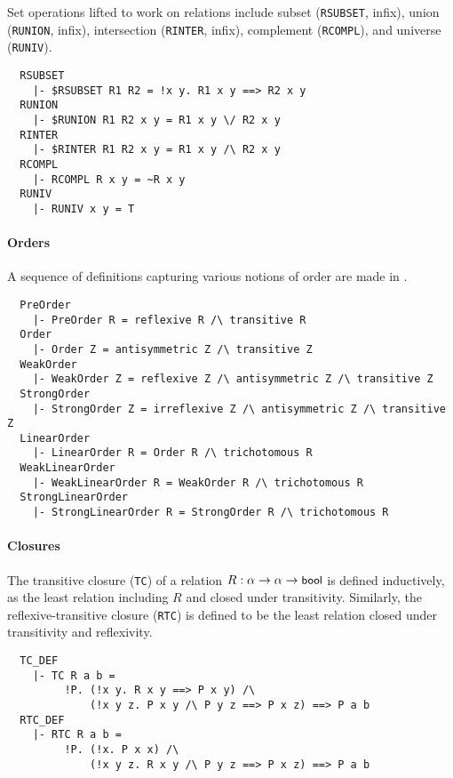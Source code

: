 Set  operations lifted to work on relations include subset
({\small\verb+RSUBSET+}, infix),
union ({\small\verb+RUNION+}, infix),
intersection ({\small\verb+RINTER+}, infix),
complement ({\small\verb+RCOMPL+}), and universe ({\small\verb+RUNIV+}).
%
\begin{hol}
{\small
\begin{verbatim}
  RSUBSET
    |- $RSUBSET R1 R2 = !x y. R1 x y ==> R2 x y
  RUNION
    |- $RUNION R1 R2 x y = R1 x y \/ R2 x y
  RINTER
    |- $RINTER R1 R2 x y = R1 x y /\ R2 x y
  RCOMPL
    |- RCOMPL R x y = ~R x y
  RUNIV
    |- RUNIV x y = T
\end{verbatim}}
\end{hol}

\paragraph {Orders}

A sequence of definitions capturing various notions of order are made
in .
%
\begin{hol}
{\small
\begin{verbatim}
  PreOrder
    |- PreOrder R = reflexive R /\ transitive R
  Order
    |- Order Z = antisymmetric Z /\ transitive Z
  WeakOrder
    |- WeakOrder Z = reflexive Z /\ antisymmetric Z /\ transitive Z
  StrongOrder
    |- StrongOrder Z = irreflexive Z /\ antisymmetric Z /\ transitive Z
  LinearOrder
    |- LinearOrder R = Order R /\ trichotomous R
  WeakLinearOrder
    |- WeakLinearOrder R = WeakOrder R /\ trichotomous R
  StrongLinearOrder
    |- StrongLinearOrder R = StrongOrder R /\ trichotomous R
\end{verbatim}}
\end{hol}

\paragraph {Closures}

The transitive closure ({\small\verb+TC+}) of a relation $R : \alpha
\to\alpha\to\mbox{\small{\textbf{\sf{bool}}}}$ is defined inductively, as the least
relation including $R$ and closed under transitivity. Similarly, the
reflexive-transitive closure ({\small\verb+RTC+}) is defined to be the least
relation closed under transitivity and reflexivity.
%
\begin{hol}
{\small
\begin{verbatim}
  TC_DEF
    |- TC R a b =
         !P. (!x y. R x y ==> P x y) /\
             (!x y z. P x y /\ P y z ==> P x z) ==> P a b
  RTC_DEF
    |- RTC R a b =
         !P. (!x. P x x) /\
             (!x y z. R x y /\ P y z ==> P x z) ==> P a b
\end{verbatim}}
\end{hol}

